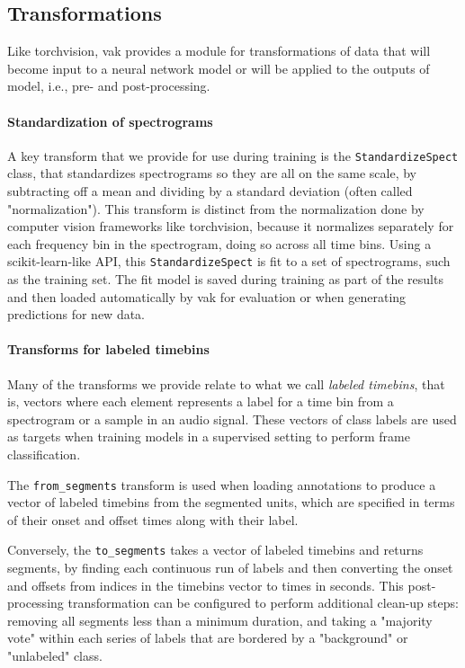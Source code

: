 \subsection{Transformations \label{subsec:transformations}}

Like torchvision, vak provides a module for transformations of data
that will become input to a neural network model or will be applied
to the outputs of model, i.e., pre- and post-processing.

\paragraph{Standardization of spectrograms}
A key transform that we provide for use during training is
the \texttt{StandardizeSpect} class,
that standardizes spectrograms so they are all
on the same scale, by subtracting off a mean and dividing by a
standard deviation
(often called "normalization").
This transform is distinct from the normalization
done by computer vision frameworks like torchvision,
because it normalizes separately for each frequency bin in the spectrogram,
doing so across all time bins.
Using a scikit-learn-like API,
this \texttt{StandardizeSpect}
is fit to a set of spectrograms,
such as the training set.
The fit model is saved during training as part of the results
and then loaded automatically by vak for evaluation
or when generating predictions for new data.

\paragraph{Transforms for labeled timebins}
Many of the transforms we provide relate to
what we call \textit{labeled timebins},
that is, vectors where each element represents
a label for a time bin from a spectrogram or a sample in an audio signal.
These vectors of class labels are used as targets
when training models in a supervised setting to perform frame classification.

The \texttt{from\_segments} transform is used when loading annotations
to produce a vector of labeled timebins from the segmented units,
which are specified in terms of their onset and offset times
along with their label.

Conversely, the \texttt{to\_segments} takes a vector of labeled timebins
and returns segments, by finding each continuous run of labels
and then converting the onset and offsets from indices in the timebins vector
to times in seconds.
This post-processing transformation can be configured to perform
additional clean-up steps:
removing all segments less than a minimum duration,
and taking a "majority vote" within each series of labels
that are bordered by a "background" or "unlabeled" class.

